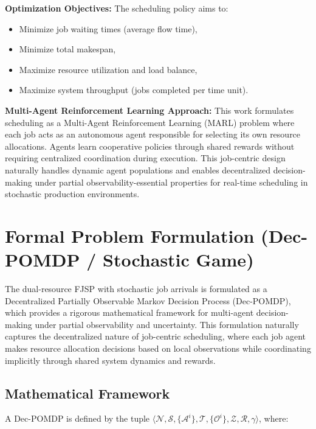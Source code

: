 \textbf{Optimization Objectives:}
The scheduling policy aims to:
\begin{itemize}
    \item Minimize job waiting times (average flow time),
    \item Minimize total makespan,
    \item Maximize resource utilization and load balance,
    \item Maximize system throughput (jobs completed per time unit).
\end{itemize}

\textbf{Multi-Agent Reinforcement Learning Approach:}
This work formulates scheduling as a Multi-Agent Reinforcement Learning (MARL) problem where each job acts as an autonomous agent responsible for selecting its own resource allocations. Agents learn cooperative policies through shared rewards without requiring centralized coordination during execution. This job-centric design naturally handles dynamic agent populations and enables decentralized decision-making under partial observability-essential properties for real-time scheduling in stochastic production environments.


\section{Formal Problem Formulation (Dec-POMDP / Stochastic Game)}
\label{sec:problemformulation}

The dual-resource FJSP with stochastic job arrivals is formulated as a Decentralized Partially Observable Markov Decision Process (Dec-POMDP), which provides a rigorous mathematical framework for multi-agent decision-making under partial observability and uncertainty. This formulation naturally captures the decentralized nature of job-centric scheduling, where each job agent makes resource allocation decisions based on local observations while coordinating implicitly through shared system dynamics and rewards.

\subsection{Mathematical Framework}
A Dec-POMDP is defined by the tuple \( \langle \mathcal{N}, \mathcal{S}, \{\mathcal{A}^i\}, \mathcal{T}, \{\mathcal{O}^i\}, \mathcal{Z}, \mathcal{R}, \gamma \rangle \), where:

